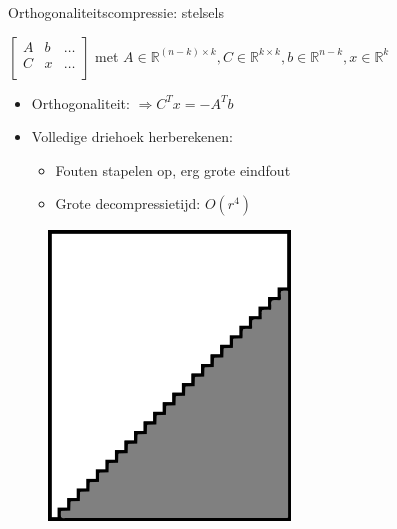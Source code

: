 \documentclass[t,12pt,dutch
\ifx\beamermode\undefined\else,\beamermode\fi
]{beamer}
\begin{document}
\begin{frame}{Orthogonaliteitscompressie: stelsels}

\begin{center}
$
\begin{bmatrix}
A & b & \dots \\[0.3em]
C & x & \dots \\[0.3em]
\end{bmatrix}
$
met $A \in \mathbb{R}^{(n-k) \times k}, C \in \mathbb{R}^{k \times k}, b \in \mathbb{R}^{n - k}, x \in \mathbb{R}^{k}$
\end{center}

\begin{itemize}
\item Orthogonaliteit: $\Rightarrow C^T x = -A^T b$
\item Volledige driehoek herberekenen:
\begin{itemize}
\item Fouten stapelen op, erg grote eindfout
\item Grote decompressietijd: $O(r^4)$
\end{itemize}
\end{itemize}

\begin{figure}[H]
\centering
\includegraphics[scale=0.8]{images/orthogonality_compression1.png}
\end{figure}

\end{frame}
\end{document}
